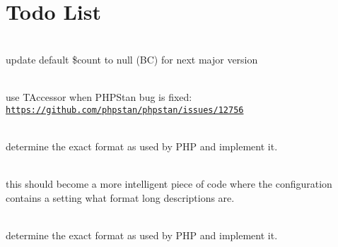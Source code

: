 \chapter{Todo List }
\hypertarget{todo}{}\label{todo}

\begin{DoxyRefList}
\item[Global \doxylink{class_faker_1_1_provider_1_1_base_a33578c6f9cb75a9dd5943154df8727d3}{Base\+::random\+Elements} (\$array=\mbox{[}\textquotesingle{}a\textquotesingle{}, \textquotesingle{}b\textquotesingle{}, \textquotesingle{}c\textquotesingle{}\mbox{]}, \$count=1, \$allow\+Duplicates=false)]\hfill \\
\label{todo__todo000006}%
%
update default \$count to {\ttfamily null} (BC) for next major version 
\item[Class \doxylink{class_illuminate_1_1_database_1_1_eloquent_1_1_relations_1_1_belongs_to_many}{Belongs\+To\+Many} ]\hfill \\
\label{todo__todo000014}%
%
use TAccessor when PHPStan bug is fixed\+: \href{https://github.com/phpstan/phpstan/issues/12756}{\texttt{https\+://github.\+com/phpstan/phpstan/issues/12756}}  
\item[Global \doxylink{class_barryvdh_1_1_reflection_1_1_doc_block_1_1_description_a278338a00e1596bbb1e906bdcf6b0a18}{Description\+::export} ()]\hfill \\
\label{todo__todo000003}%
%
determine the exact format as used by PHP  and implement it. 
\item[Global \doxylink{class_barryvdh_1_1_reflection_1_1_doc_block_1_1_description_ab55813ce13282a8d0cf066fb51925af1}{Description\+::get\+Formatted\+Contents} ()]\hfill \\
\label{todo__todo000002}%
%
this should become a more intelligent piece of code where the configuration contains a setting what format long descriptions are. 
\item[Global \doxylink{class_barryvdh_1_1_reflection_1_1_doc_block_a278338a00e1596bbb1e906bdcf6b0a18}{Doc\+Block\+::export} ()]\hfill \\
\label{todo__todo000001}%
%
determine the exact format as used by PHP  and implement it. 
\item[Global \doxylink{class_masterminds_1_1_h_t_m_l5_1_1_parser_1_1_d_o_m_tree_builder_a8db487096fdb6c481604ad7ef846fc00}{DOMTree\+Builder\+::start\+Tag} (\$name, \$attributes=array(), \$self\+Closing=false)]\hfill \\

\end{DoxyRefList}
